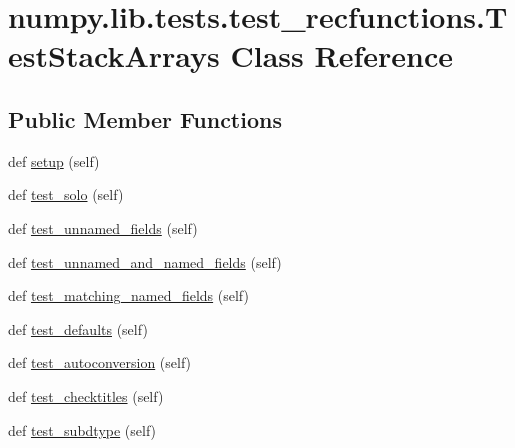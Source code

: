 \hypertarget{classnumpy_1_1lib_1_1tests_1_1test__recfunctions_1_1TestStackArrays}{}\section{numpy.\+lib.\+tests.\+test\+\_\+recfunctions.\+Test\+Stack\+Arrays Class Reference}
\label{classnumpy_1_1lib_1_1tests_1_1test__recfunctions_1_1TestStackArrays}
\subsection*{Public Member Functions}
\begin{DoxyCompactItemize}
\item 
def \hyperlink{classnumpy_1_1lib_1_1tests_1_1test__recfunctions_1_1TestStackArrays_ad12ac936923ac8f51496d140cdb664e5}{setup} (self)
\item 
def \hyperlink{classnumpy_1_1lib_1_1tests_1_1test__recfunctions_1_1TestStackArrays_a131e2dcd4a27b844f73f39f4bc8d133d}{test\+\_\+solo} (self)
\item 
def \hyperlink{classnumpy_1_1lib_1_1tests_1_1test__recfunctions_1_1TestStackArrays_a051cd88a14a7a75f30d71b676f9e3fb7}{test\+\_\+unnamed\+\_\+fields} (self)
\item 
def \hyperlink{classnumpy_1_1lib_1_1tests_1_1test__recfunctions_1_1TestStackArrays_a5faf7d775d7728d02a3b3c1804fbf0b4}{test\+\_\+unnamed\+\_\+and\+\_\+named\+\_\+fields} (self)
\item 
def \hyperlink{classnumpy_1_1lib_1_1tests_1_1test__recfunctions_1_1TestStackArrays_a712548d45c6983db28753894172daadc}{test\+\_\+matching\+\_\+named\+\_\+fields} (self)
\item 
def \hyperlink{classnumpy_1_1lib_1_1tests_1_1test__recfunctions_1_1TestStackArrays_ac901b575d29763d0ff100b17858bcfae}{test\+\_\+defaults} (self)
\item 
def \hyperlink{classnumpy_1_1lib_1_1tests_1_1test__recfunctions_1_1TestStackArrays_ab4c726f46ff8a1ac0d2aa739342175e9}{test\+\_\+autoconversion} (self)
\item 
def \hyperlink{classnumpy_1_1lib_1_1tests_1_1test__recfunctions_1_1TestStackArrays_af81a4988617d2843d1be69efc1cf8362}{test\+\_\+checktitles} (self)
\item 
def \hyperlink{classnumpy_1_1lib_1_1tests_1_1test__recfunctions_1_1TestStackArrays_a94c2c8d6049261e90c57eb2d8f7287e6}{test\+\_\+subdtype} (self)
\end{DoxyCompactItemize}
